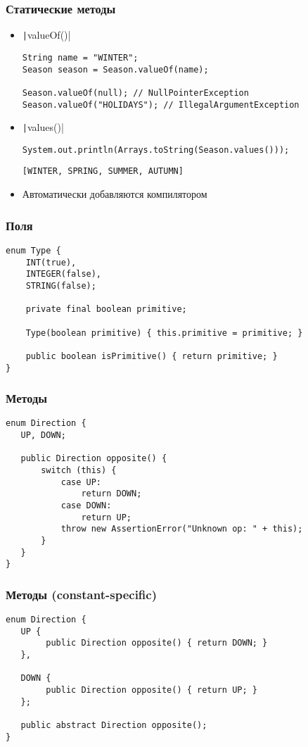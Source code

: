 \documentclass[xetex,mathserif,serif]{beamer}
\begin{document}
	\begin{frame}[fragile]
		\frametitle{Статические методы}
		\begin{itemize}
			\item \texttt|valueOf()|
				\begin{verbatim}
String name = "WINTER"; 
Season season = Season.valueOf(name); 

Season.valueOf(null); // NullPointerException
Season.valueOf("HOLIDAYS"); // IllegalArgumentException
				\end{verbatim}
			\item \texttt|values()|
				\begin{verbatim}
System.out.println(Arrays.toString(Season.values()));
				\end{verbatim}
				\vspace{3mm}
				\begin{verbatim}
[WINTER, SPRING, SUMMER, AUTUMN]
				\end{verbatim}
			\item Автоматически добавляются компилятором
		\end{itemize}
	\end{frame}

	\begin{frame}[fragile]
		\frametitle{Поля}
		\begin{verbatim}
enum Type {
    INT(true), 
    INTEGER(false),
    STRING(false); 
 
    private final boolean primitive;
     
    Type(boolean primitive) { this.primitive = primitive; } 
 
    public boolean isPrimitive() { return primitive; } 
} 
		\end{verbatim}
	\end{frame}

	\begin{frame}[fragile]
		\frametitle{Методы}
		\begin{verbatim}
enum Direction { 
   UP, DOWN; 
 
   public Direction opposite() {
       switch (this) {
           case UP:
               return DOWN;
           case DOWN:
               return UP;
           throw new AssertionError("Unknown op: " + this);
       }
   } 
}
		\end{verbatim}
	\end{frame}

	\begin{frame}[fragile]
		\frametitle{Методы (constant-specific)}
		\begin{verbatim}
enum Direction { 
   UP { 
        public Direction opposite() { return DOWN; } 
   }, 
   
   DOWN { 
        public Direction opposite() { return UP; } 
   }; 
 
   public abstract Direction opposite(); 
}
		\end{verbatim}
	\end{frame}
\end{document}
